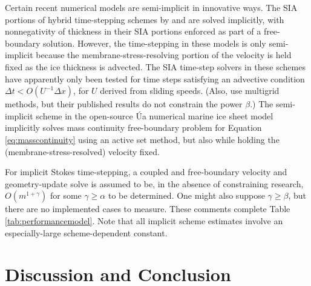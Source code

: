 \documentclass[review]{igs}
\begin{document}
Certain recent numerical models are semi-implicit in innovative ways.  The SIA portions of hybrid time-stepping schemes by \cite{JouvetGraeser2013} and \cite{BrinkerhoffJohnson2015} are solved implicitly, with nonnegativity of thickness in their SIA portions enforced as part of a free-boundary solution.  However, the time-stepping in these models is only semi-implicit because the membrane-stress-resolving portion of the velocity is held fixed as the ice thickness is advected.  The SIA time-step solvers in these schemes have apparently only been tested for time steps satisfying an advective condition $\Delta t < O(U^{-1}\Delta x)$, for $U$ derived from sliding speeds.  (Also, \cite{JouvetGraeser2013} use multigrid methods, but their published results do not constrain the power $\beta$.)
The semi-implicit scheme in the open-source \'Ua numerical marine ice sheet model \citep[see also G.~H.~Gudmundsson, \emph{{\'U}a {C}ompendium}, \href{https://github.com/GHilmarG/UaSource}{\texttt{github.com/GHilmarG/UaSource}}]{Gudmundsson2013} implicitly solves mass continuity free-boundary problem for Equation \eqref{eq:masscontinuity} using an active set method, but also while holding the (membrane-stress-resolved) velocity fixed.

For implicit Stokes time-stepping, a coupled and free-boundary velocity and geometry-update solve is assumed to be, in the absence of constraining research, $O(m^{1+\gamma})$ for some $\gamma \ge \alpha$ to be determined.  One might also suppose $\gamma\ge \beta$, but there are no implemented cases to measure.  These comments complete Table \ref{tab:performancemodel}.  Note that all implicit scheme estimates involve an especially-large scheme-dependent constant.


\section{Discussion and Conclusion}
\end{document}
